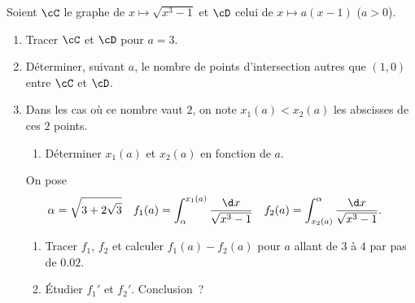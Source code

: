 \begin{enonce}
\begin{exercise}[ID={RMS 124 1280},subtitle={Maple},tags={}, difficulty={0}]
Soient $\cC$ le graphe de $x\mapsto \sqrt{x^3-1}$ et $\cD$ celui de $x\mapsto
a(x-1)$ ($a>0$).
\begin{enumerate}
  \item Tracer $\cC$ et $\cD$ pour $a=3$.
  \item Déterminer, suivant $a$, le nombre de points d'intersection autres que
    $(1,0)$ entre $\cC$ et $\cD$.
  \item Dans les cas où ce nombre vaut $2$, on note $x_1(a)<x_2(a)$ les
    abscisses de ces $2$ points.
  \begin{enumerate}
    \item Déterminer $x_1(a)$ et $x_2(a)$ en fonction de $a$.
  \end{enumerate}
  On pose
  \begin{align*}
    \alpha &= \sqrt{3+2\sqrt3} &
    f_1(a) &= \int_\alpha^{x_1(a)} \frac{\d x}{\sqrt{x^3-1}} &
    f_2(a) &= \int_{x_2(a)}^\alpha \frac{\d x}{\sqrt{x^3-1}}.
  \end{align*}
  \begin{enumerate}[resume]
    \item Tracer $f_1$, $f_2$ et calculer $f_1(a) - f_2(a)$ pour $a$ allant de
      $3$ à $4$ par pas de $0.02$.
    \item Étudier $f_1'$ et $f_2'$. Conclusion~?
  \end{enumerate}
\end{enumerate}
\end{exercise}
\begin{solution}
\end{solution}
\end{enonce}
